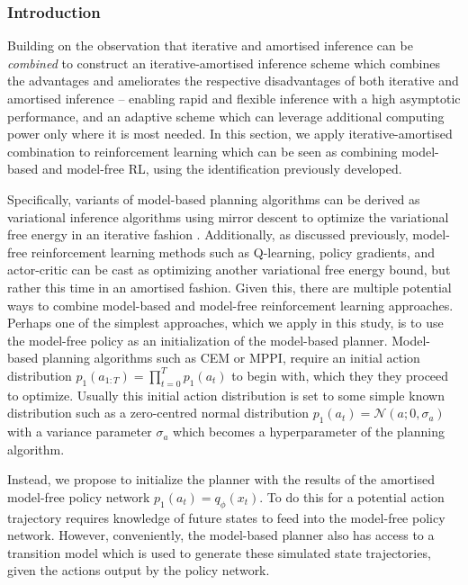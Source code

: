 \subsubsection{Introduction}
Building on the observation that iterative and amortised inference can be \emph{combined} to construct an iterative-amortised inference scheme which combines the advantages and ameliorates the respective disadvantages of both iterative and amortised inference -- enabling rapid and flexible inference with a high asymptotic performance, and an adaptive scheme which can leverage additional computing power only where it is most needed. In this section, we apply iterative-amortised combination to reinforcement learning which can be seen as combining model-based and model-free RL, using the identification previously developed.

Specifically, variants of model-based planning algorithms can be derived as variational inference algorithms using mirror descent to optimize the variational free energy in an iterative fashion \citep{okada_variational_2019}.
Additionally, as discussed previously, model-free reinforcement learning methods such as Q-learning, policy gradients, and actor-critic can be cast as optimizing another variational free energy bound, but rather this time in an amortised fashion. Given this, there are multiple potential ways to combine model-based and model-free reinforcement learning approaches. Perhaps one of the simplest approaches, which we apply in this study, is to use the model-free policy as an initialization of the model-based planner. Model-based planning algorithms such as CEM or MPPI, require an initial action distribution $p_1(a_{1:T}) = \prod_{t=0}^T p_1(a_t)$ to begin with, which they they proceed to optimize. Usually this initial action distribution is set to some simple known distribution such as a zero-centred normal distribution $p_1(a_t) = \mathcal{N}(a; 0, \sigma_a)$ with a variance parameter $\sigma_a$ which becomes a hyperparameter of the planning algorithm.

Instead, we propose to initialize the planner with the results of the amortised model-free policy network $p_1(a_t) = q_\phi(x_t)$. To do this for a potential action trajectory requires knowledge of future states to feed into the model-free policy network. However, conveniently, the model-based planner also has access to a transition model which is used to generate these simulated state trajectories, given the actions output by the policy network. 

